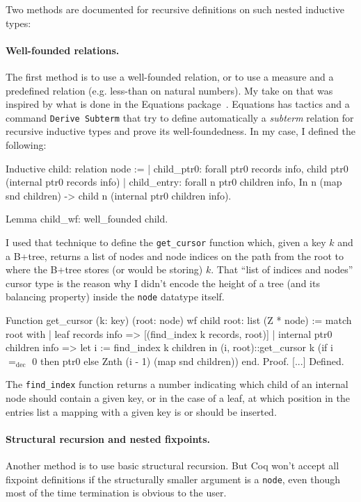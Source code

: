 \documentclass[11pt]{article}
\def\coqe{\lstinline[language=Coq, basicstyle=\small]}
\begin{document}
Two methods are documented for recursive definitions on such nested inductive types:
\paragraph{Well-founded relations.}
The first method is to use a well-founded relation, or to use a measure and a predefined relation (e.g. less-than on natural numbers).
My take on that was inspired by what is done in the Equations package~\cite{ER}.
Equations has tactics and a command \coqe{Derive Subterm} that try to define automatically a \emph{subterm} relation for recursive inductive types and prove its well-foundedness.
In my case, I defined the following:
\begin{coq}
Inductive child: relation node :=
| child_ptr0: forall ptr0 records info,
    child ptr0 (internal ptr0 records info)
| child_entry: forall n ptr0 children info,
    In n (map snd children) ->
    child n (internal ptr0 children info).
  
Lemma child_wf: well_founded child.
\end{coq}

I used that technique to define the \coqe{get_cursor} function which, given a key $k$ and a B+tree,
returns a list of nodes and node indices on the path from the root to where the B+tree stores (or would be storing) $k$.
That ``list of indices and nodes'' cursor type is the reason why I didn't encode the height of a tree (and its balancing property) inside the \coqe{node} datatype itself.
\begin{coq}
Function get_cursor (k: key) (root: node) {wf child root}: list (Z * node) :=
match root with
| leaf records info => [(find_index k records, root)]
| internal ptr0 children info =>
    let i := find_index k children in
    (i, root)::get_cursor k (if i $=_\mathrm{dec}$ 0 then ptr0
                                else Znth (i - 1) (map snd children))
end.
Proof. [...] Defined.
\end{coq}
The \coqe{find_index} function returns a number indicating which child of an internal node should contain a given key,
or in the case of a leaf, at which position in the entries list a mapping with a given key is or should be inserted.

\paragraph{Structural recursion and nested fixpoints.}
Another method is to use basic structural recursion.
But Coq won't accept all fixpoint definitions if the structurally smaller argument is a \coqe{node}, even though most of the time termination is obvious to the user.
\end{document}
